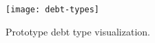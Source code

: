 \begin{figure}[ht]
  \texttt{[image: debt-types]}
  \caption[Debt types]{Prototype debt type visualization.}
  \label{fig:debt-type}
  \centering
\end{figure}